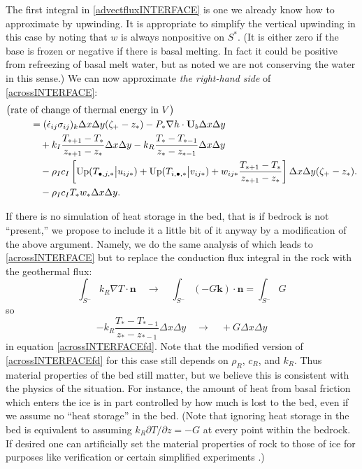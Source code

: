 \documentclass[12pt,final]{amsart}%
\theoremstyle{plain}
\theoremstyle{definition}
\theoremstyle{remark}
\def\eps{\epsilon}
\newcommand{\grad}{\nabla}
\newcommand{\khat}{\mathbf{k}}
\newcommand{\nhat}{\mathbf{n}}
\newcommand{\Up}{\ensuremath{\operatorname{Up}}}
\newcommand{\bU}{{\mathbf{U}}}
\begin{document}
The first integral in \eqref{advectfluxINTERFACE} is one we already know how to approximate by upwinding.  It is appropriate to simplify the vertical upwinding in this case by noting that $w$ is always nonpositive on $S^\ast$.  (It is either zero if the base is frozen or negative if there is basal melting.  In fact it could be positive from refreezing of basal melt water, but as noted we are not conserving the water in this sense.)  We can now approximate \emph{the right-hand side} of \eqref{acrossINTERFACE}:
\begin{align}
\big(\text{rate }&\text{of change of thermal energy in }V\big) \label{acrossINTERFACEfd}\\
    &= (\dot\eps_{ij} \sigma_{ij})_k \Delta x \Delta y (\zeta_+ - z_\ast) - P_\ast \grad h \cdot \bU_b \Delta x \Delta y \notag\\
    &\quad + k_I \frac{T_{\ast+1}-T_\ast}{z_{\ast+1}-z_\ast} \Delta x \Delta y  - k_R \frac{T_{\ast}-T_{\ast-1}}{z_{\ast}-z_{\ast-1}} \Delta x \Delta y \notag\\
    &\quad - \rho_I c_I \left[\Up(T_{\bullet,j,\ast} \big|u_{ij\ast}) + \Up(T_{i,\bullet,\ast} \big|v_{ij\ast}) + w_{ij\ast} \frac{T_{\ast+1}-T_\ast}{z_{\ast+1}-z_\ast}\right] \Delta x \Delta y (\zeta_+ - z_\ast). \notag \\
    &\quad - \rho_I c_I T_\ast w_\ast \Delta x \Delta y. \notag
\end{align}

If there is no simulation of heat storage in the bed, that is if bedrock is not ``present,'' we propose to include it a little bit of it anyway by a modification of the above argument.  Namely, we do the same analysis of which leads to \eqref{acrossINTERFACE} but to replace the conduction flux integral in the rock with the geothermal flux:
    $$\int_{S^-} k_R \grad T \cdot \nhat \quad\to\quad \int_{S^-} (-G\khat) \cdot \nhat = \int_{S^-} G$$
so
\begin{equation}\label{norockREPLACEfd}
- k_R \frac{T_{\ast}-T_{\ast-1}}{z_{\ast}-z_{\ast-1}} \Delta x \Delta y \quad\to\quad + G \Delta x \Delta y
\end{equation}
in equation \eqref{acrossINTERFACEfd}.  Note that the modified version of \eqref{acrossINTERFACEfd} for this case still depends on $\rho_R$, $c_R$, and $k_R$.  Thus material properties of the bed still matter, but we believe this is consistent with the physics of the situation.  For instance, the amount of heat from basal friction which enters the ice is in part controlled by how much is lost to the bed, even if we assume no ``heat storage'' in the bed.  (Note that ignoring heat storage in the bed is equivalent to assuming $k_R\partial T/\partial z = -G$ at every point within the bedrock.  If desired one can artificially set the material properties of rock to those of ice for purposes like verification \citep{BBL} or certain simplified experiments \citep{EISMINT00}.)
\end{document}
